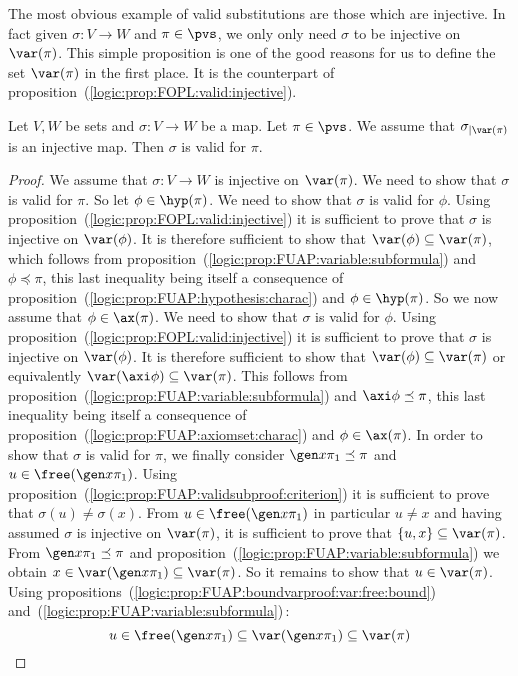 The most obvious example of valid substitutions are those which are
injective. In fact given $\sigma:V\to W$ and $\pi\in\pvs$, we only
only need $\sigma$ to be injective on $\var(\pi)$. This simple
proposition is one of the good reasons for us to define the set
$\var(\pi)$ in the first place. It is the counterpart of
proposition~(\ref{logic:prop:FOPL:valid:injective}).
\begin{prop}\label{logic:prop:FUAP:validsubproof:injective}
Let $V, W$ be sets and $\sigma:V\to W$ be a map. Let $\pi\in\pvs$.
We assume that $\sigma_{|\var(\pi)}$ is an injective map. Then
$\sigma$ is valid for $\pi$.
\end{prop}
\begin{proof}
We assume that $\sigma:V\to W$ is injective on $\var(\pi)$. We need
to show that $\sigma$ is valid for $\pi$. So let $\phi\in\hyp(\pi)$.
We need to show that $\sigma$ is valid for $\phi$. Using
proposition~(\ref{logic:prop:FOPL:valid:injective}) it is sufficient
to prove that $\sigma$ is injective on $\var(\phi)$. It is therefore
sufficient to show that $\var(\phi)\subseteq\var(\pi)$, which
follows from proposition~(\ref{logic:prop:FUAP:variable:subformula})
and $\phi\preceq\pi$, this last inequality being itself a
consequence of proposition~(\ref{logic:prop:FUAP:hypothesis:charac})
and $\phi\in\hyp(\pi)$. So we now assume that $\phi\in\ax(\pi)$. We
need to show that $\sigma$ is valid for $\phi$. Using
proposition~(\ref{logic:prop:FOPL:valid:injective}) it is sufficient
to prove that $\sigma$ is injective on $\var(\phi)$. It is therefore
sufficient to show that $\var(\phi)\subseteq\var(\pi)$ or
equivalently $\var(\axi\phi)\subseteq\var(\pi)$. This follows from
proposition~(\ref{logic:prop:FUAP:variable:subformula}) and
$\axi\phi\preceq\pi$, this last inequality being itself a
consequence of proposition~(\ref{logic:prop:FUAP:axiomset:charac})
and $\phi\in\ax(\pi)$. In order to show that $\sigma$ is valid for
$\pi$, we finally consider $\gen x\pi_{1}\preceq\pi$ and
$u\in\free(\gen x\pi_{1})$. Using
proposition~(\ref{logic:prop:FUAP:validsubproof:criterion}) it is
sufficient to prove that $\sigma(u)\neq\sigma(x)$. From
$u\in\free(\gen x\pi_{1})$ in particular $u\neq x$ and having
assumed $\sigma$ is injective on $\var(\pi)$, it is sufficient to
prove that $\{u,x\}\subseteq\var(\pi)$. From $\gen
x\pi_{1}\preceq\pi$ and
proposition~(\ref{logic:prop:FUAP:variable:subformula}) we obtain
$x\in\var(\gen x\pi_{1})\subseteq\var(\pi)$. So it remains to show
that $u\in\var(\pi)$. Using
propositions~(\ref{logic:prop:FUAP:boundvarproof:var:free:bound})
and~(\ref{logic:prop:FUAP:variable:subformula})\,:
    \[
    u\in\free(\gen x\pi_{1})\subseteq \var(\gen x\pi_{1})\subseteq\var(\pi)
    \]
\end{proof}

